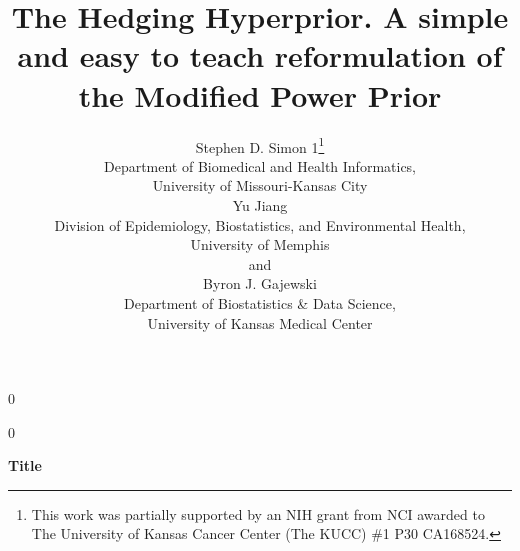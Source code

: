 \documentclass[12pt]{article}
\newcommand{\blind}{0}
\begin{document}
%

\def\spacingset#1{\renewcommand{\baselinestretch}%
{#1}\small\normalsize} \spacingset{1}



\blind
{
  \title{\bf The Hedging Hyperprior. A simple and easy to teach reformulation of the Modified Power Prior}
  \author{Stephen D. Simon 1\thanks{
    This work was partially supported by an NIH grant from NCI awarded to The University of Kansas Cancer Center (The KUCC) \#1 P30 CA168524.}\hspace{.2cm}\\
    Department of Biomedical and Health Informatics,\\University of Missouri-Kansas City\\
    Yu Jiang\\
    Division of Epidemiology, Biostatistics, and Environmental Health,\\University of Memphis\\
    and \\
    Byron J. Gajewski\\
    Department of Biostatistics \& Data Science,\\University of Kansas Medical Center}
  \maketitle
} \fi

\blind
{
  \bigskip
  \bigskip
  \bigskip
  \begin{center}
    {\LARGE\bf Title}
\end{center}
  \medskip
} \fi
\end{document}
